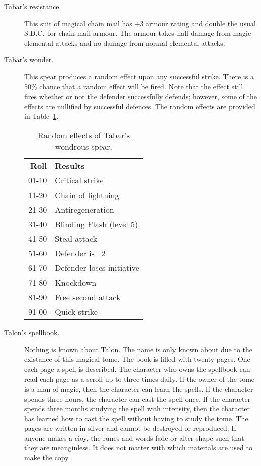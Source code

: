 \begin{description}
\item[Tabar's resistance.]
This suit of magical chain mail has +3 armour rating and
double the usual S.D.C.\ for chain mail armour.
The armour takes half damage from magic elemental attacks
and no damage from normal elemental attacks.

\item[Tabar's wonder.]
This spear produces a random effect upon any successful
strike.
There is a
50\% chance that a random effect will be fired.
Note that the effect still fires whether or not
the defender successfully defends;
however, some of the effects are nullified by
successful defences.
The random effects are provided in Table~\ref{table-tabarwonder}.
\begin{table}[ht]
\centering
\begin{tabular}{rl}
\toprule
{\bfseries Roll} & {\bfseries Results} \\ 
01-10&Critical strike \\ 
11-20&Chain of lightning \\ 
21-30&Antiregeneration \\ 
31-40&Blinding Flash (level 5) \\ 
41-50&Steal attack \\ 
51-60&Defender is --2 \\ 
61-70&Defender loses initiative \\ 
71-80&Knockdown \\ 
81-90&Free second attack \\ 
91-00&Quick strike \\ 
\bottomrule
\end{tabular}
\caption{Random effects of Tabar's wondrous spear.}
\label{table-tabarwonder}
\end{table}

\item[Talon's spellbook.]
Nothing is known about Talon.
The name is only known about due to the existance
of this magical tome.
The book is filled with twenty pages.
One each page a spell is described.
The character who owns the spellbook can read
each page as a scroll up to three times daily.
If the owner of the tome is a man of magic,
then the character can learn the spells.
If the character spends three hours, the character
can cast the spell once.
If the character spends three months studying the
spell with intensity, then the character has learned
how to cast the spell without having to study the
tome.
The pages are written in silver and cannot be
destroyed or reproduced.
If anyone makes a cioy, the runes and
words fade or alter shape
such that they are meanginless.
It does not matter with which materials are used to
make the copy.


\end{description}
